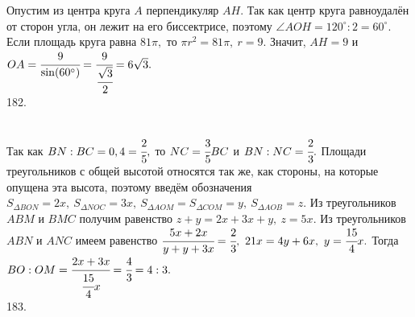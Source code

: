 \documentclass[12pt]{article}
\begin{document}
Опустим из центра круга $A$ перпендикуляр $AH.$ Так как центр круга равноудалён от сторон угла, он лежит на его биссектрисе, поэтому $\angle AOH=120^\circ:2=60^\circ.$ Если площадь круга равна $81\pi,$ то $\pi r^2=81\pi,\ r=9.$ Значит, $AH=9$ и $OA=\cfrac{9}{\sin(60^\circ)}=\cfrac{9}{\cfrac{\sqrt{3}}{2}}=6\sqrt{3}.$\\
182. \begin{figure}[ht!]
\end{figure}\\
Так как $BN:BC=0,4=\cfrac{2}{5},$ то $NC=\cfrac{3}{5}BC$ и $BN:NC=\cfrac{2}{3}.$ Площади треугольников с общей высотой относятся так же, как стороны, на которые опущена эта высота, поэтому введём обозначения $S_{\Delta BON}=2x,\ S_{\Delta NOC}=3x,\ S_{\Delta AOM}=S_{\Delta COM}=y,\ S_{\Delta AOB}=z.$ Из треугольников $ABM$ и $BMC$ получим равенство $z+y=2x+3x+y,\ z=5x.$ Из треугольников $ABN$ и $ANC$ имеем равенство $\cfrac{5x+2x}{y+y+3x}=\cfrac{2}{3},\ 21x=4y+6x,\ y=\cfrac{15}{4}x.$
Тогда $BO:OM=\cfrac{2x+3x}{\cfrac{15}{4}x}=\cfrac{4}{3}=4:3.$\\
183. \begin{figure}[ht!]
\end{figure}\\
\end{document}
